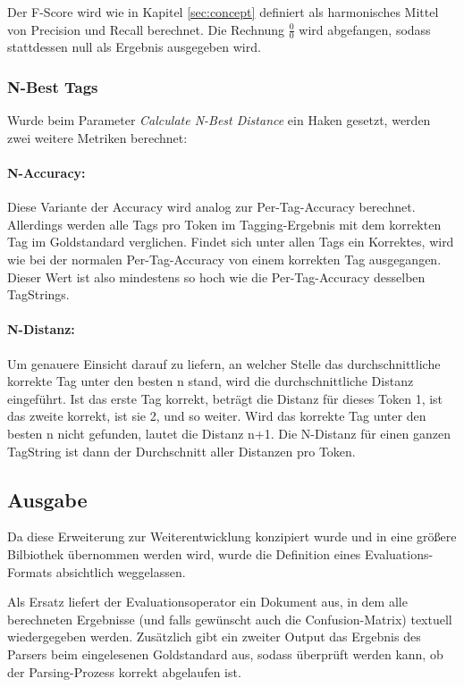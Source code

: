 Der F-Score wird wie in Kapitel \ref{sec:concept} definiert als harmonisches Mittel von Precision und Recall berechnet. Die Rechnung $\frac{0}{0}$ wird abgefangen, sodass stattdessen null als Ergebnis ausgegeben wird.

\subsubsection{N-Best Tags}
Wurde beim Parameter \textit{Calculate N-Best Distance} ein Haken gesetzt, werden zwei weitere Metriken berechnet:

\paragraph{N-Accuracy:} Diese Variante der Accuracy wird analog zur Per-Tag-Accuracy berechnet. Allerdings werden alle Tags pro Token im Tagging-Ergebnis mit dem korrekten Tag im Goldstandard verglichen. Findet sich unter allen Tags ein Korrektes, wird wie bei der normalen Per-Tag-Accuracy von einem korrekten Tag ausgegangen. Dieser Wert ist also mindestens so hoch wie die Per-Tag-Accuracy desselben TagStrings.
\paragraph{N-Distanz:} Um genauere Einsicht darauf zu liefern, an welcher Stelle das durchschnittliche korrekte Tag unter den besten n stand, wird die durchschnittliche Distanz eingeführt. Ist das erste Tag korrekt, beträgt die Distanz für dieses Token 1, ist das zweite korrekt, ist sie 2, und so weiter. Wird das  korrekte Tag unter den besten n nicht gefunden, lautet die Distanz n+1. Die N-Distanz für einen ganzen TagString ist dann der Durchschnitt aller Distanzen pro Token.

\subsection{Ausgabe}
\label{sec:impl:eval:out}

Da diese Erweiterung zur Weiterentwicklung konzipiert wurde und in eine größere Bilbiothek übernommen werden wird, wurde die Definition eines Evaluations-Formats absichtlich weggelassen.

Als Ersatz liefert der Evaluationsoperator ein Dokument aus, in dem alle berechneten Ergebnisse (und falls gewünscht auch die Confusion-Matrix) textuell wiedergegeben werden. Zusätzlich gibt ein zweiter Output das Ergebnis des Parsers beim eingelesenen Goldstandard aus, sodass überprüft werden kann, ob der Parsing-Prozess korrekt abgelaufen ist.

